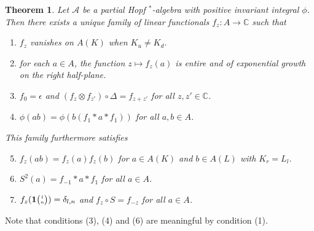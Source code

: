 \documentclass[10pt]{article}
\newcommand{\C}{\mathbb{C}}
\newcommand{\Grt}[3]{#1{\tiny {\begin{pmatrix} #2\\#3\end{pmatrix}}}}
\newcommand{\UnitC}[2]{\Grt{\mathbf{1}}{#1}{#2}}
\newtheorem{Theorem}{Theorem}[section]
\theoremstyle{definition}
\numberwithin{equation}{section}
\begin{document}
\begin{Theorem} \label{thm:rep-characters} Let $\mathscr{A}$ be a partial Hopf $^*$-algebra with positive invariant integral $\phi$.  Then there exists a unique
  family of linear functionals $f_{z} \colon A\to \C$ such that
\begin{enumerate}[label={(\arabic*)}]
  \item $f_z$ vanishes on $A(K)$ when $K_u\neq K_d$.
  \item for each $a\in A$, the function $z\mapsto f_{z}(a)$ is entire
    and of exponential growth on the right half-plane.
  \item $f_{0} = \epsilon$ and $(f_{z} \otimes f_{z'}) \circ 
    \Delta= f_{z+z'}$ for all $z,z' \in \C$.
  \item $\phi(ab)=\phi(b(f_{1} \ast a \ast f_{1}))$ for all $a,b\in A$.
  \end{enumerate}
  This family furthermore satisfies
  \begin{enumerate}[label={(\arabic*)}]\setcounter{enumi}{4}
  \item $f_z(ab) = f_z(a)f_z(b)$ for $a\in A(K)$ and $b\in A(L)$ with $K_r = L_l$. 
  \item $S^{2}(a)=f_{-1} \ast a \ast f_{1}$ for all $a\in A$.
  \item $f_{z}(\UnitC{l}{n})=\delta_{l,n}$ and $f_{z} \circ S = f_{-z}$ for all $a\in A$.
\end{enumerate}
\end{Theorem}


Note that conditions (3), (4) and (6) are meaningful by condition (1).
\end{document}
